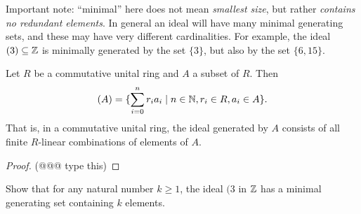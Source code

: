 Important note: ``minimal'' here does not mean \emph{smallest size}, but rather \emph{contains no redundant elements}.
In general an ideal will have many minimal generating sets, and these may have very different cardinalities.
For example, the ideal \((3) \subseteq \mathbb{Z}\) is minimally generated by the set \(\{3\}\), but also by the set \(\{6,15\}\).

\begin{prop}
Let \(R\) be a commutative unital ring and \(A\) a subset of \(R\).
Then \[ (A) = \{ \sum_{i=0}^n r_ia_i \mid n \in \mathbb{N}, r_i \in R, a_i \in A \}. \]
That is, in a commutative unital ring, the ideal generated by \(A\) consists of all finite \(R\)-linear combinations of elements of \(A\).
\end{prop}

\begin{proof}
(@@@ type this)
\end{proof}



\Exercises%

\begin{exercise}
Show that for any natural number \(k \geq 1\), the ideal \((3\) in \(\mathbb{Z}\) has a minimal generating set containing \(k\) elements.
\end{exercise}
